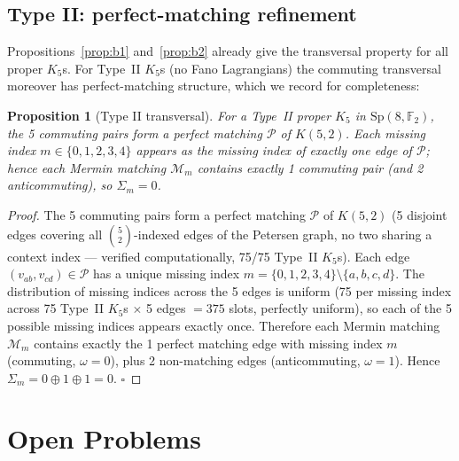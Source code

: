 \documentclass[11pt,a4paper]{article}
\newtheorem{proposition}[theorem]{Proposition}
\theoremstyle{remark}
\newcommand{\Sp}{\mathrm{Sp}}
\begin{document}
\subsection{Type II: perfect-matching refinement}

Propositions~\ref{prop:b1} and~\ref{prop:b2} already give the transversal property
for all proper $K_5$s. For Type~II $K_5$s (no Fano Lagrangians) the commuting
transversal moreover has perfect-matching structure, which we record for
completeness:

\begin{proposition}[Type II transversal]\label{prop:typeII}
For a Type~II proper $K_5$ in $\Sp(8,\mathbb{F}_2)$,
the 5 commuting pairs form a perfect matching $\mathcal{P}$ of $K(5,2)$.
Each missing index $m \in \{0,1,2,3,4\}$ appears as the missing index
of exactly one edge of $\mathcal{P}$; hence each Mermin matching $\mathcal{M}_m$
contains exactly 1 commuting pair (and 2 anticommuting), so $\Sigma_m = 0$.
\end{proposition}

\begin{proof}
The 5 commuting pairs form a perfect matching $\mathcal{P}$ of $K(5,2)$
(5 disjoint edges covering all $\binom{5}{2}$-indexed edges of the Petersen graph,
no two sharing a context index --- verified computationally, 75/75 Type~II $K_5$s).
Each edge $(v_{ab}, v_{cd}) \in \mathcal{P}$ has a unique missing index
$m = \{0,1,2,3,4\} \setminus \{a,b,c,d\}$.
The distribution of missing indices across the 5 edges is uniform (75 per
missing index across 75 Type~II $K_5$s $\times$ 5 edges $= 375$ slots,
perfectly uniform), so each of the 5 possible missing indices appears exactly once.
Therefore each Mermin matching $\mathcal{M}_m$ contains exactly the 1 perfect matching
edge with missing index $m$ (commuting, $\omega=0$), plus 2 non-matching edges
(anticommuting, $\omega=1$). Hence $\Sigma_m = 0\oplus 1\oplus 1 = 0$. $\square$
\end{proof}


\section{Open Problems}\label{sec:open}
\end{document}

